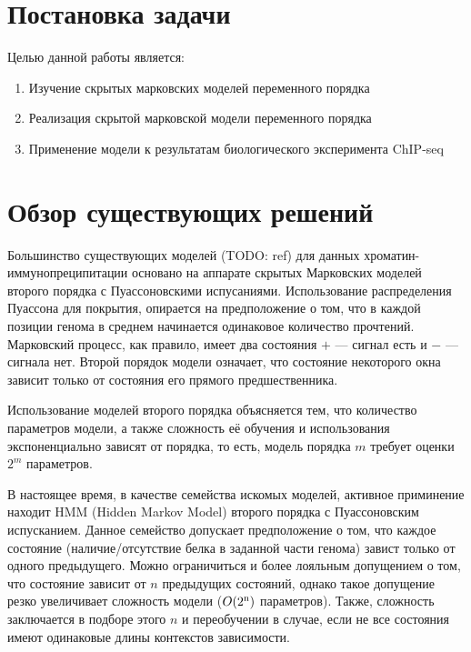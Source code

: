 \documentclass{matmex-diploma-custom}
\begin{document}
\section{Постановка задачи}
Целью данной работы является:
\begin{enumerate}
\item
Изучение скрытых марковских моделей переменного порядка
\item
Реализация скрытой марковской модели переменного порядка
\item
Применение модели к результатам биологического эксперимента ChIP-seq 
\end{enumerate}

\section{Обзор существующих решений}
Большинство существующих моделей (TODO: ref) для данных
хроматин-иммунопреципитации основано на аппарате скрытых Марковских моделей
второго порядка с Пуассоновскими испусаниями. Использование распределения
Пуассона для покрытия, опирается на предположение о том, что в каждой
позиции генома в среднем начинается одинаковое количество прочтений. Марковский
процесс, как правило, имеет два состояния $+$ --- сигнал есть и $-$ --- сигнала
нет. Второй порядок модели означает, что состояние некоторого окна зависит только
от состояния его прямого предшественника.

Использование моделей второго порядка объясняется тем, что количество параметров
модели, а также сложность её обучения и использования экспоненциально зависят от
порядка, то есть, модель порядка $m$ требует оценки $2^m$ параметров.


В настоящее время, в качестве семейства искомых моделей, активное приминение находит HMM (Hidden Markov Model)\cite{Rabiner1989} второго порядка с Пуассоновским испусканием.
Данное семейство допускает предположение о том, что каждое состояние (наличие/отсутствие белка в заданной части генома) завист только от одного предыдущего.
Можно ограничиться и более лояльным допущением о том, что состояние зависит от $n$ предыдущих состояний, однако такое допущение резко увеличивает сложность модели ($O(2\textsuperscript{n})$ параметров). Также, сложность заключается в подборе этого $n$ и переобучении в случае, если не все состояния имеют одинаковые длины контекстов зависимости.
\end{document}
